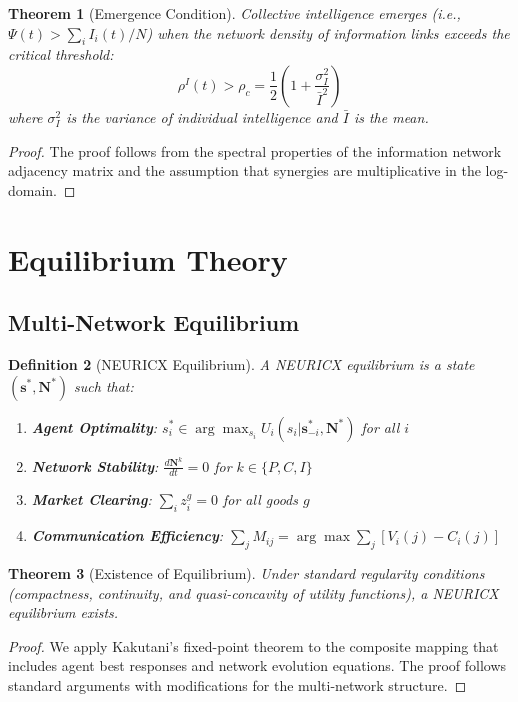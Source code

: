 \documentclass[12pt,a4paper]{article}
\newtheorem{theorem}{Theorem}[section]
\newtheorem{definition}[theorem]{Definition}
\begin{document}
\begin{theorem}[Emergence Condition]
Collective intelligence emerges (i.e., $\Psi(t) > \sum_i I_i(t)/N$) when the network density of information links exceeds the critical threshold:
\begin{equation}
\rho^I(t) > \rho_c = \frac{1}{2}\left(1 + \frac{\sigma_I^2}{\bar{I}^2}\right)
\end{equation}
where $\sigma_I^2$ is the variance of individual intelligence and $\bar{I}$ is the mean.
\end{theorem}

\begin{proof}
The proof follows from the spectral properties of the information network adjacency matrix and the assumption that synergies are multiplicative in the log-domain.
\end{proof}

\section{Equilibrium Theory}

\subsection{Multi-Network Equilibrium}

\begin{definition}[NEURICX Equilibrium]
A NEURICX equilibrium is a state $(\mathbf{s}^*, \mathbf{N}^*)$ such that:
\begin{enumerate}
\item \textbf{Agent Optimality}: $s_i^* \in \arg\max_{s_i} U_i(s_i | \mathbf{s}_{-i}^*, \mathbf{N}^*)$ for all $i$
\item \textbf{Network Stability}: $\frac{d\mathbf{N}^k}{dt} = 0$ for $k \in \{P, C, I\}$
\item \textbf{Market Clearing}: $\sum_i z_i^g = 0$ for all goods $g$
\item \textbf{Communication Efficiency}: $\sum_j M_{ij} = \arg\max \sum_j [V_i(j) - C_i(j)]$
\end{enumerate}
\end{definition}

\begin{theorem}[Existence of Equilibrium]
Under standard regularity conditions (compactness, continuity, and quasi-concavity of utility functions), a NEURICX equilibrium exists.
\end{theorem}

\begin{proof}
We apply Kakutani's fixed-point theorem to the composite mapping that includes agent best responses and network evolution equations. The proof follows standard arguments with modifications for the multi-network structure.
\end{proof}
\end{document}
